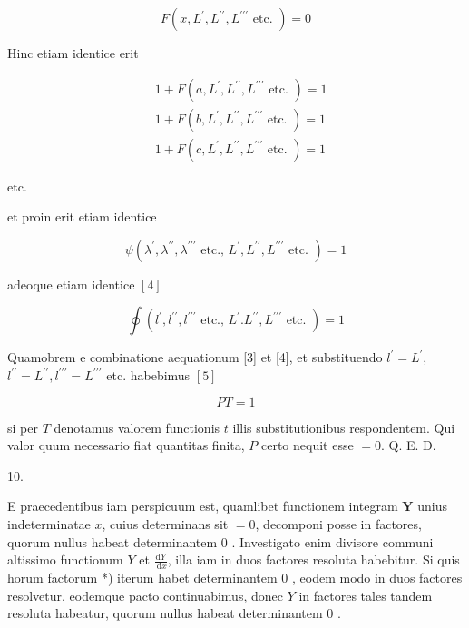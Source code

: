 \documentclass[10pt]{article}
\begin{document}
\[
F\left(x, L^{\prime}, L^{\prime \prime}, L^{\prime \prime \prime} \text { etc. }\right)=0
\]

Hinc etiam identice erit

\[
\begin{aligned}
& 1+F\left(a, L^{\prime}, L^{\prime \prime}, L^{\prime \prime \prime} \text { etc. }\right)=1 \\
& 1+F\left(b, L^{\prime}, L^{\prime \prime}, L^{\prime \prime \prime} \text { etc. }\right)=1 \\
& 1+F\left(c, L^{\prime}, L^{\prime \prime}, L^{\prime \prime \prime} \text { etc. }\right)=1
\end{aligned}
\]

etc.

et proin erit etiam identice

\[
\psi\left(\lambda^{\prime}, \lambda^{\prime \prime}, \lambda^{\prime \prime \prime} \text { etc., } L^{\prime}, L^{\prime \prime}, L^{\prime \prime \prime} \text { etc. }\right)=1
\]

adeoque etiam identice \([4]\)

\[
\oint\left(l^{\prime}, l^{\prime \prime}, l^{\prime \prime \prime} \text { etc., } L^{\prime} . L^{\prime \prime}, L^{\prime \prime \prime} \text { etc. }\right)=1
\]

Quamobrem e combinatione aequationum [3] et [4], et substituendo \(l^{\prime}=L^{\prime}\), \(l^{\prime \prime}=L^{\prime \prime}, l^{\prime \prime \prime}=L^{\prime \prime \prime}\) etc. habebimus \([5]\)

\[
P T=1
\]

si per \(T\) denotamus valorem functionis \(t\) illis substitutionibus respondentem. Qui valor quum necessario fiat quantitas finita, \(P\) certo nequit esse \(=0\). Q. E. D.

10.

E praecedentibus iam perspicuum est, quamlibet functionem integram \(\boldsymbol{Y}\) unius indeterminatae \(x\), cuius determinans sit \(=0\), decomponi posse in factores, quorum nullus habeat determinantem 0 . Investigato enim divisore communi altissimo functionum \(Y\) et \(\frac{\mathrm{d} Y}{\mathrm{~d} x}\), illa iam in duos factores resoluta habebitur. Si quis horum factorum *) iterum habet determinantem 0 , eodem modo in duos factores resolvetur, eodemque pacto continuabimus, donec \(Y\) in factores tales tandem resoluta habeatur, quorum nullus habeat determinantem 0 .
\end{document}
